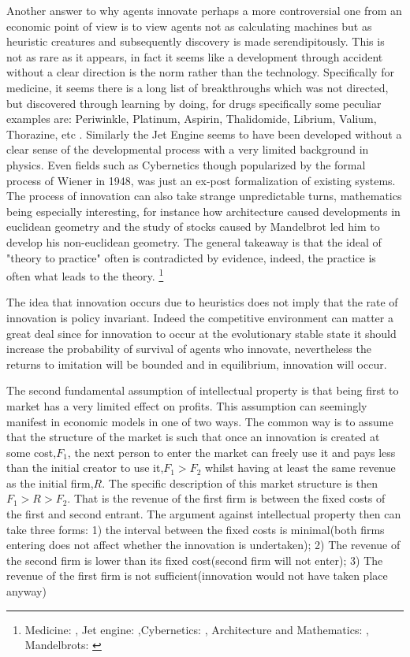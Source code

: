 \documentclass[12pt]{article}
\numberwithin{equation}{section}
\begin{document}
Another answer to why agents innovate perhaps a more controversial one from an economic point of view is to view agents not as calculating machines but as heuristic creatures and subsequently discovery is made serendipitously. This is not as rare as it appears, in fact it seems like a development through accident without a clear direction is the norm rather than the technology. Specifically for medicine, it seems there is a long list of breakthroughs which was not directed, but discovered through learning by doing, for drugs specifically some peculiar examples are: Periwinkle, Platinum, Aspirin, Thalidomide, Librium, Valium, Thorazine, etc . Similarly the Jet Engine seems to have been developed without a clear sense of the developmental process with a very limited background in physics. Even fields such as Cybernetics though popularized by the formal process of Wiener in 1948, was just an ex-post formalization of existing systems. The process of innovation can also take strange unpredictable turns, mathematics being especially interesting, for instance how architecture caused developments in euclidean geometry and the study of stocks caused by Mandelbrot led him to develop his non-euclidean geometry. The general takeaway is that the ideal of "theory to practice" often is contradicted by evidence, indeed, the practice is often what leads to the theory. \footnote{ Medicine: \cite{meyers2007happy}, Jet engine: \cite{scranton2006urgency},Cybernetics: \cite{mindell2002between}, Architecture and Mathematics: \cite{unguru1992guy}, Mandelbrots: \cite{mandelbrot}}

The idea that innovation occurs due to heuristics does not imply that the rate of innovation is policy invariant. Indeed the competitive environment can matter a great deal since for innovation to occur at the evolutionary stable state it should increase the probability of survival of agents who innovate, nevertheless the returns to imitation will be bounded and in equilibrium, innovation will occur. \cite{Winter1993}



The second fundamental assumption of intellectual property is that being first to market has a very limited effect on profits. This assumption can seemingly manifest in economic models in one of two ways. The common way is to assume that the structure of the market is such that once an innovation is created at some cost,$F_1$, the next person to enter the market can freely use it and pays less than the initial creator to use it,$F_1>F_2$ whilst having at least the same revenue as the initial firm,$R$. The specific description of this market structure is then $F_1>R>F_2$. That is the revenue of the first firm is between the fixed costs of the first and second entrant. The argument against intellectual property then can take three forms: 1) the interval between the fixed costs is minimal(both firms entering does not affect whether the innovation is undertaken); 2) The revenue of the second firm is lower than its fixed cost(second firm will not enter); 3) The revenue of the first firm is not sufficient(innovation would not have taken place anyway)
\end{document}
